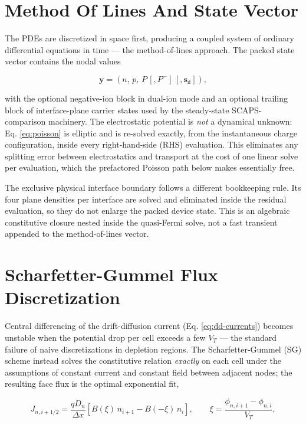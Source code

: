 \documentclass[
  11pt,
  american,
]{report}
\begin{document}
\hypertarget{method-of-lines-and-state-vector}{%
\section{Method Of Lines And State
Vector}\label{method-of-lines-and-state-vector}}

The PDEs are discretized in space first, producing a coupled system of
ordinary differential equations in time --- the method-of-lines
approach. The packed state vector contains the nodal values

\[
\mathbf{y}=(n,\,p,\,P\,[,P^-]\,[,\mathbf{s}_\mathrm{if}]),
\]

with the optional negative-ion block in dual-ion mode and an optional
trailing block of interface-plane carrier states used by the
steady-state SCAPS-comparison machinery. The electrostatic potential is
\emph{not} a dynamical unknown: Eq. \ref{eq:poisson} is elliptic and is
re-solved exactly, from the instantaneous charge configuration, inside
every right-hand-side (RHS) evaluation. This eliminates any splitting
error between electrostatics and transport at the cost of one linear
solve per evaluation, which the prefactored Poisson path below makes
essentially free.

The exclusive physical interface boundary follows a different
bookkeeping rule. Its four plane densities per interface are solved and
eliminated inside the residual evaluation, so they do not enlarge the
packed device state. This is an algebraic constitutive closure nested
inside the quasi-Fermi solve, not a fast transient appended to the
method-of-lines vector.

\hypertarget{scharfetter-gummel-flux-discretization}{%
\section{Scharfetter-Gummel Flux
Discretization}\label{scharfetter-gummel-flux-discretization}}

Central differencing of the drift-diffusion current (Eq.
\ref{eq:dd-currents}) becomes unstable when the potential drop per cell
exceeds a few \(V_T\) --- the standard failure of naive discretizations
in depletion regions. The Scharfetter-Gummel (SG) scheme instead solves
the constitutive relation \emph{exactly} on each cell under the
assumptions of constant current and constant field between adjacent
nodes; the resulting face flux is the optimal exponential fit,

\begin{equation}
\label{eq:sg-electron}
J_{n,i+1/2}
=
\frac{qD_n}{\Delta x}
\left[
B(\xi)\,n_{i+1}-B(-\xi)\,n_i
\right],
\qquad
\xi = \frac{\phi_{n,i+1}-\phi_{n,i}}{V_T},
\end{equation}
\end{document}
